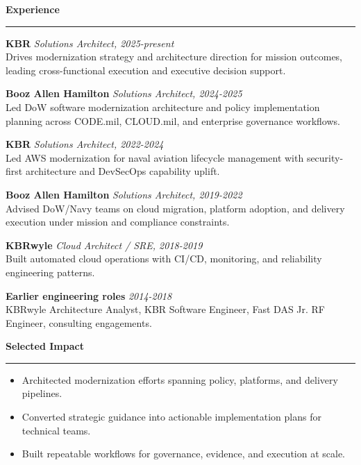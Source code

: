 \documentclass[10pt]{article}
\newcommand{\RightSection}[1]{\vspace{0.35em}\textbf{\large #1}\par\textcolor{accentgold}{\rule{\linewidth}{0.8pt}}\vspace{0.2em}}
\begin{document}
\begin{minipage}[t]{0.64\textwidth}
\RightSection{Experience}
\textbf{KBR} \hfill \textit{Solutions Architect, 2025-present}\\
Drives modernization strategy and architecture direction for mission outcomes, leading cross-functional execution and executive decision support.

\textbf{Booz Allen Hamilton} \hfill \textit{Solutions Architect, 2024-2025}\\
Led DoW software modernization architecture and policy implementation planning across CODE.mil, CLOUD.mil, and enterprise governance workflows.

\textbf{KBR} \hfill \textit{Solutions Architect, 2022-2024}\\
Led AWS modernization for naval aviation lifecycle management with security-first architecture and DevSecOps capability uplift.

\textbf{Booz Allen Hamilton} \hfill \textit{Solutions Architect, 2019-2022}\\
Advised DoW/Navy teams on cloud migration, platform adoption, and delivery execution under mission and compliance constraints.

\textbf{KBRwyle} \hfill \textit{Cloud Architect / SRE, 2018-2019}\\
Built automated cloud operations with CI/CD, monitoring, and reliability engineering patterns.

\textbf{Earlier engineering roles} \hfill \textit{2014-2018}\\
KBRwyle Architecture Analyst, KBR Software Engineer, Fast DAS Jr. RF Engineer, consulting engagements.

\RightSection{Selected Impact}
\begin{itemize}
  \item Architected modernization efforts spanning policy, platforms, and delivery pipelines.
  \item Converted strategic guidance into actionable implementation plans for technical teams.
  \item Built repeatable workflows for governance, evidence, and execution at scale.
\end{itemize}
\end{minipage}
\end{document}
